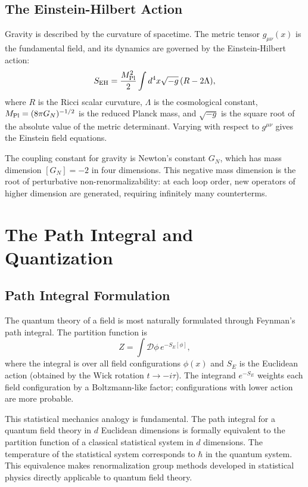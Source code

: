 \documentclass[12pt,a4paper,oneside]{book}
\theoremstyle{definition}
\theoremstyle{plain}
\theoremstyle{remark}
\begin{document}
\section{The Einstein-Hilbert Action}

Gravity is described by the curvature of spacetime. The metric tensor
$g_{\mu\nu}(x)$ is the fundamental field, and its dynamics are governed by the
Einstein-Hilbert action:
\begin{equation}
S_{\rm EH} = \frac{M_{\rm Pl}^2}{2}\int d^4x\sqrt{-g}\,(R - 2\Lambda),
\end{equation}
where $R$ is the Ricci scalar curvature, $\Lambda$ is the cosmological constant,
$M_{\rm Pl} = (8\pi G_N)^{-1/2}$ is the reduced Planck mass, and $\sqrt{-g}$
is the square root of the absolute value of the metric determinant. Varying
with respect to $g^{\mu\nu}$ gives the Einstein field equations.

The coupling constant for gravity is Newton's constant $G_N$, which has mass
dimension $[G_N] = -2$ in four dimensions. This negative mass dimension is
the root of perturbative non-renormalizability: at each loop order, new
operators of higher dimension are generated, requiring infinitely many
counterterms.

\chapter{The Path Integral and Quantization}

\section{Path Integral Formulation}

The quantum theory of a field is most naturally formulated through Feynman's
path integral. The partition function is
\begin{equation}
Z = \int \mathcal{D}\phi\,e^{-S_E[\phi]},
\end{equation}
where the integral is over all field configurations $\phi(x)$ and $S_E$ is
the Euclidean action (obtained by the Wick rotation $t \to -i\tau$). The
integrand $e^{-S_E}$ weights each field configuration by a Boltzmann-like
factor; configurations with lower action are more probable.

This statistical mechanics analogy is fundamental. The path integral for a
quantum field theory in $d$ Euclidean dimensions is formally equivalent to the
partition function of a classical statistical system in $d$ dimensions. The
temperature of the statistical system corresponds to $\hbar$ in the quantum
system. This equivalence makes renormalization group methods developed in
statistical physics directly applicable to quantum field theory.
\end{document}
